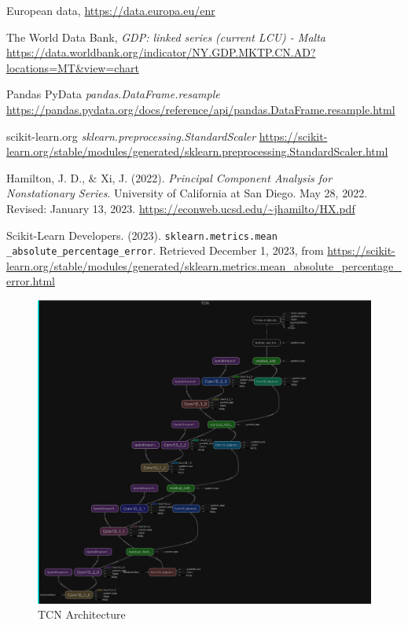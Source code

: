 \documentclass{ieeeaccess}
\begin{document}
\begin{thebibliography}{00}
 European data, \url{https://data.europa.eu/enr}

 The World Data Bank, \emph{GDP: linked series (current LCU) - Malta} \url{https://data.worldbank.org/indicator/NY.GDP.MKTP.CN.AD?locations=MT&view=chart}

 Pandas PyData \emph{pandas.DataFrame.resample} \url{https://pandas.pydata.org/docs/reference/api/pandas.DataFrame.resample.html}

 scikit-learn.org \emph{sklearn.preprocessing.StandardScaler} \url{https://scikit-learn.org/stable/modules/generated/sklearn.preprocessing.StandardScaler.html}

 Hamilton, J. D., \& Xi, J. (2022). \emph{Principal Component Analysis for Nonstationary Series}. University of California at San Diego. May 28, 2022. Revised: January 13, 2023. \url{https://econweb.ucsd.edu/~jhamilto/HX.pdf}

 Scikit-Learn Developers. (2023). \texttt{sklearn.metrics.mean} \texttt{\_absolute\_percentage\_error}. Retrieved December 1, 2023, from \url{https://scikit-learn.org/stable/modules/generated/sklearn.metrics.mean\_absolute\_percentage\_error.html}

\end{thebibliography}

\newpage
\begin{figure}[htb]
    \centering
    \includegraphics[width=2\columnwidth]{Model-TCN/TCN_architecture_graph.PNG}
    \caption{TCN Architecture}
    \label{fig:TCN_architecture_graph}
\end{figure}

\EOD
\end{document}
